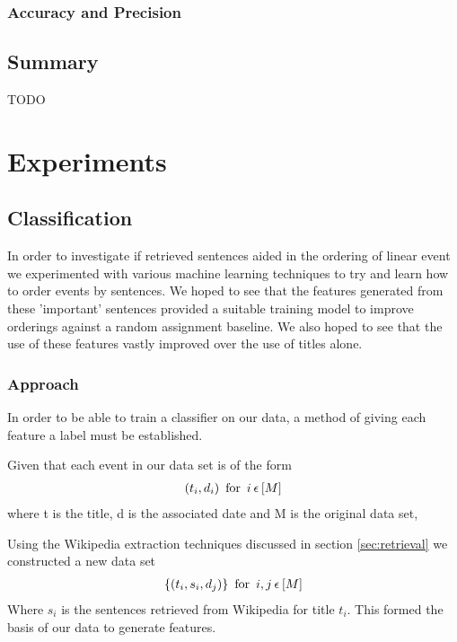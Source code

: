 \documentclass[bsc,frontabs,twoside,singlespacing,parskip,deptreport]{infthesis}     %
\begin{document}
\subsection{Accuracy and Precision}

\section{Summary}
TODO

\chapter{Experiments}
\section{Classification}
In order to investigate if retrieved sentences aided in the  ordering of linear event we experimented with various
machine learning techniques to try and learn how to order events by sentences.
We hoped to see that the features generated from these 'important' sentences provided a suitable training model
to improve orderings against a random assignment baseline. We also hoped to see that the use of these features vastly
improved over the use of titles alone.


\subsection{Approach}
In order to be able to train a classifier on our data, a method of giving each feature a label must be established.

 Given that each event in our data set is of the form
  \begin{eqnarray}
  (t_{i},d_{i}) \hspace{0.5em} \text{for} \hspace{0.5em} i \hspace{0.2em}\epsilon \hspace{0.2em} [M]\nonumber
    \end{eqnarray}
    where t is the title, d is the associated date and M is the original data set,

    Using the Wikipedia extraction techniques discussed in section \ref{sec:retrieval} we constructed a new data set
    \begin{eqnarray}
      \{(t_{i},s_{i},d_{j})\} \hspace{0.5em} \text{for} \hspace{0.5em}i,j  \hspace{0.2em}\epsilon \hspace{0.2em}[M]\nonumber
    \end{eqnarray}
    Where $s_i$ is the sentences retrieved from Wikipedia for title $t_i$. 
    This formed the basis of our data to generate features.
\end{document}
